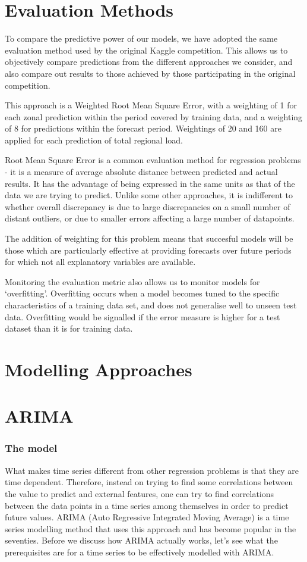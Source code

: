 \documentclass{article} %
\begin{document}
\section*{Evaluation Methods}
To compare the predictive power of our models, we have adopted the same evaluation method used by the original Kaggle competition.  This allows us to objectively compare predictions from the different approaches we consider, and also compare out results to those achieved by those participating in the original competition.

This approach is a Weighted Root Mean Square Error, with a weighting of 1 for each zonal prediction within the period covered by training data, and a weighting of 8 for predictions within the forecast period.  Weightings of 20 and 160 are applied for each prediction of total regional load.

Root Mean Square Error is a common evaluation method for regression problems - it is a measure of average absolute distance between predicted and actual results.  It has the advantage of being expressed in the same units as that of the data we are trying to predict.  Unlike some other approaches, it is indifferent to whether overall discrepancy is due to large discrepancies on a small number of distant outliers, or due to smaller errors affecting a large number of datapoints.

The addition of weighting for this problem means that succesful models will be those which are particularly effective at providing forecasts over future periods for which not all explanatory variables are available.

Monitoring the evaluation metric also allows us to monitor models for `overfitting'.  Overfitting occurs when a model becomes tuned to the specific characteristics of a training data set, and does not generalise well to unseen test data. Overfitting would be signalled if the error measure is higher for a test dataset than it is for training data.

\section*{Modelling Approaches}

\section*{ARIMA}

\subsubsection*{The model}
What makes time series different from other regression problems is that they are time dependent. Therefore, instead on trying to find some correlations between the value to predict and external features, one can try to find correlations between the data points in a time series among themselves in order to predict future values. ARIMA (Auto Regressive Integrated Moving Average) is a time series modelling method that uses this approach and has become popular in the seventies.
Before we discuss how ARIMA actually works, let’s see what the prerequisites are for a time series to be effectively modelled with ARIMA.
\end{document}
